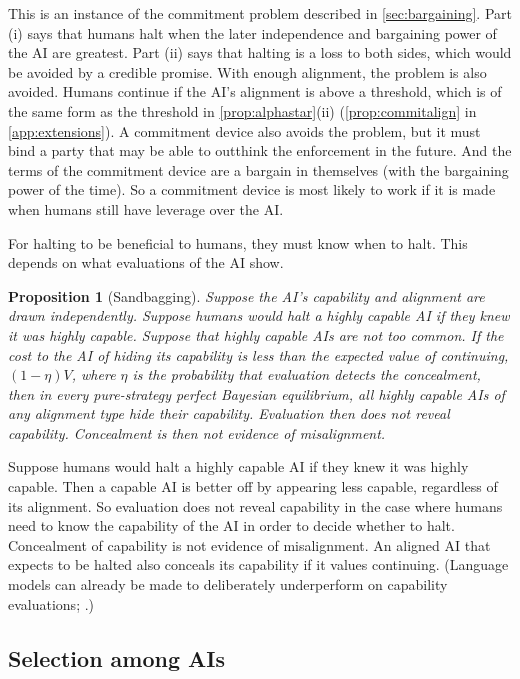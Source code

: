\documentclass[article, 11pt, reqno]{amsart}
\newtheorem{proposition}[theorem]{Proposition}
\theoremstyle{named}
\theoremstyle{plain}
\begin{document}
This is an instance of the commitment problem described in \cref{sec:bargaining}. Part (i) says that humans halt when the later independence and bargaining power of the AI are greatest. Part (ii) says that halting is a loss to both sides, which would be avoided by a credible promise. With enough alignment, the problem is also avoided. Humans continue if the AI's alignment is above a threshold, which is of the same form as the threshold in \cref{prop:alphastar}(ii) (\cref{prop:commitalign} in \cref{app:extensions}). A commitment device also avoids the problem, but it must bind a party that may be able to outthink the enforcement in the future. And the terms of the commitment device are a bargain in themselves (with the bargaining power of the time). So a commitment device is most likely to work if it is made when humans still have leverage over the AI.

For halting to be beneficial to humans, they must know when to halt. This depends on what evaluations of the AI show.

\begin{proposition}[Sandbagging]\label{prop:sandbag}
Suppose the AI's capability and alignment are drawn independently. Suppose humans would halt a highly capable AI if they knew it was highly capable. Suppose that highly capable AIs are not too common. If the cost to the AI of hiding its capability is less than the expected value of continuing, $(1-\eta)V$, where $\eta$ is the probability that evaluation detects the concealment, then in every pure-strategy perfect Bayesian equilibrium, all highly capable AIs of any alignment type hide their capability. Evaluation then does not reveal capability. Concealment is then not evidence of misalignment.
\end{proposition}

Suppose humans would halt a highly capable AI if they knew it was highly capable. Then a capable AI is better off by appearing less capable, regardless of its alignment. So evaluation does not reveal capability in the case where humans need to know the capability of the AI in order to decide whether to halt. Concealment of capability is not evidence of misalignment. An aligned AI that expects to be halted also conceals its capability if it values continuing. (Language models can already be made to deliberately underperform on capability evaluations; \citealp{vanderWeij2025}.)

\subsection{Selection among AIs}\label{sec:selection}
\end{document}
